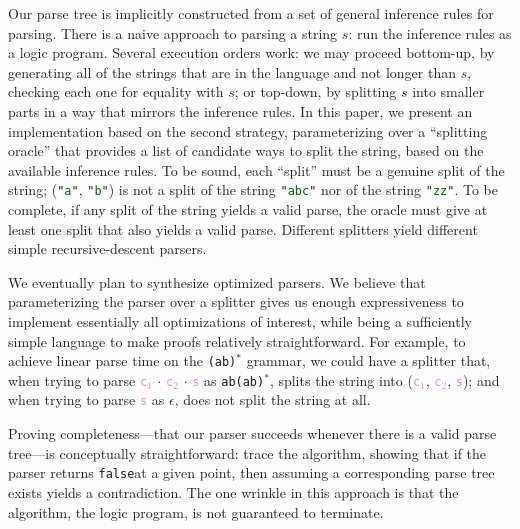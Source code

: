 \documentclass[preprint]{sigplanconf}
\newcommand{\todoAdamOrJason}[1]{\textcolor{purple}{\textbf{TODO} (\textcolor{red}{Adam} \textcolor{black}{or} \textcolor{blue}{Jason}): #1}}
\newcommand{\str}[1]{\texttt{"\textcolor{DarkGreen}{#1}"}}
\newcommand{\regex}[1]{\texttt{#1}}
\newcommand{\terminal}[1]{\texttt{\textquotesingle\textcolor{DarkGreen}{#1}\textquotesingle}}
\newcommand{\false}{\texttt{false}}
\newcommand{\farg}[1]{\textcolor{violet}{\texttt{#1}}}
\newcommand{\llstrcat}[2]{#1 \ensuremath{\cdot} #2}
\begin{document}
  Our parse tree is implicitly constructed from a set of general inference rules for parsing.  There is a naive approach to parsing a string $s$: run the inference rules as a logic program.  Several execution orders work: we may proceed bottom-up, by generating all of the strings that are in the language and not longer than $s$, checking each one for equality with $s$; or top-down, by splitting $s$ into smaller parts in a way that mirrors the inference rules.  In this paper, we present an implementation based on the second strategy, parameterizing over a ``splitting oracle'' that provides a list of candidate ways to split the string, based on the available inference rules.  To be sound, each ``split'' must be a genuine split of the string; (\str{a}, \str{b}) is not a split of the string \str{abc} nor of the string \str{zz}.  To be complete, if any split of the string yields a valid parse, the oracle must give at least one split that also yields a valid parse.  Different splitters yield different simple recursive-descent parsers. %


  We eventually plan to synthesize optimized parsers.  We believe that parameterizing the parser over a splitter gives us enough expressiveness to implement essentially all optimizations of interest, while being a sufficiently simple language to make proofs relatively straightforward.  For example, to achieve linear parse time on the \regex{(ab)$^*$} grammar, we could have a splitter that, when trying to parse \llstrcat{\llstrcat{\terminal{\farg{c$_1$}}}{\terminal{\farg{c$_2$}}}}{\farg{s}} as \regex{ab(ab)$^*$}, splits the string into (\terminal{\farg{c$_1$}}, \terminal{\farg{c$_2$}}, \farg{s}); and when trying to parse \farg{s} as $\epsilon$, does not split the string at all.



  Proving completeness---that our parser succeeds whenever there is a valid parse tree---is conceptually straightforward: trace the algorithm, showing that if the parser returns \false\space at a given point, then assuming a corresponding parse tree exists yields a contradiction.  The one wrinkle in this approach is that the algorithm, the logic program, is not guaranteed to terminate.
\end{document}
